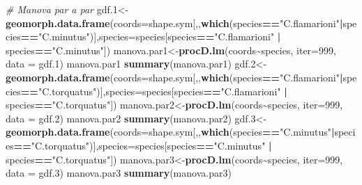 \documentclass[
]{book}
\newenvironment{Shaded}{\begin{snugshade}}{\end{snugshade}}
\newcommand{\AttributeTok}[1]{\textcolor[rgb]{0.13,0.29,0.53}{#1}}
\newcommand{\CommentTok}[1]{\textcolor[rgb]{0.56,0.35,0.01}{\textit{#1}}}
\newcommand{\DecValTok}[1]{\textcolor[rgb]{0.00,0.00,0.81}{#1}}
\newcommand{\FloatTok}[1]{\textcolor[rgb]{0.00,0.00,0.81}{#1}}
\newcommand{\FunctionTok}[1]{\textcolor[rgb]{0.13,0.29,0.53}{\textbf{#1}}}
\newcommand{\NormalTok}[1]{#1}
\newcommand{\OtherTok}[1]{\textcolor[rgb]{0.56,0.35,0.01}{#1}}
\newcommand{\SpecialCharTok}[1]{\textcolor[rgb]{0.81,0.36,0.00}{\textbf{#1}}}
\newcommand{\StringTok}[1]{\textcolor[rgb]{0.31,0.60,0.02}{#1}}
\begin{document}
\begin{Shaded}
\begin{Highlighting}[]
\CommentTok{\# Manova par a par}
\NormalTok{gdf}\FloatTok{.1}\OtherTok{\textless{}{-}} \FunctionTok{geomorph.data.frame}\NormalTok{(}\AttributeTok{coords=}\NormalTok{shape.sym[,,}\FunctionTok{which}\NormalTok{(species}\SpecialCharTok{==}\StringTok{"C.flamarioni"}\SpecialCharTok{|}\NormalTok{species}\SpecialCharTok{==}\StringTok{"C.minutus"}\NormalTok{)],}\AttributeTok{species=}\NormalTok{species[species}\SpecialCharTok{==}\StringTok{"C.flamarioni"} \SpecialCharTok{|}\NormalTok{ species}\SpecialCharTok{==}\StringTok{"C.minutus"}\NormalTok{])}
\NormalTok{manova.par1}\OtherTok{\textless{}{-}}\FunctionTok{procD.lm}\NormalTok{(coords}\SpecialCharTok{\textasciitilde{}}\NormalTok{species, }\AttributeTok{iter=}\DecValTok{999}\NormalTok{, }\AttributeTok{data =}\NormalTok{ gdf}\FloatTok{.1}\NormalTok{)}
\NormalTok{manova.par1}
\FunctionTok{summary}\NormalTok{(manova.par1)}
\NormalTok{gdf}\FloatTok{.2}\OtherTok{\textless{}{-}}
  \FunctionTok{geomorph.data.frame}\NormalTok{(}\AttributeTok{coords=}\NormalTok{shape.sym[,,}\FunctionTok{which}\NormalTok{(species}\SpecialCharTok{==}\StringTok{"C.flamarioni"}\SpecialCharTok{|}\NormalTok{species}\SpecialCharTok{==}\StringTok{"C.torquatus"}\NormalTok{)],}\AttributeTok{species=}\NormalTok{species[species}\SpecialCharTok{==}\StringTok{"C.flamarioni"} \SpecialCharTok{|}\NormalTok{ species}\SpecialCharTok{==}\StringTok{"C.torquatus"}\NormalTok{])}
\NormalTok{manova.par2}\OtherTok{\textless{}{-}}\FunctionTok{procD.lm}\NormalTok{(coords}\SpecialCharTok{\textasciitilde{}}\NormalTok{species, }\AttributeTok{iter=}\DecValTok{999}\NormalTok{, }\AttributeTok{data =}\NormalTok{ gdf}\FloatTok{.2}\NormalTok{)}
\NormalTok{manova.par2}
\FunctionTok{summary}\NormalTok{(manova.par2)}
\NormalTok{gdf}\FloatTok{.3}\OtherTok{\textless{}{-}}
  \FunctionTok{geomorph.data.frame}\NormalTok{(}\AttributeTok{coords=}\NormalTok{shape.sym[,,}\FunctionTok{which}\NormalTok{(species}\SpecialCharTok{==}\StringTok{"C.minutus"}\SpecialCharTok{|}\NormalTok{species}\SpecialCharTok{==}\StringTok{"C.torquatus"}\NormalTok{)],}\AttributeTok{species=}\NormalTok{species[species}\SpecialCharTok{==}\StringTok{"C.minutus"} \SpecialCharTok{|}\NormalTok{ species}\SpecialCharTok{==}\StringTok{"C.torquatus"}\NormalTok{])}
\NormalTok{manova.par3}\OtherTok{\textless{}{-}}\FunctionTok{procD.lm}\NormalTok{(coords}\SpecialCharTok{\textasciitilde{}}\NormalTok{species, }\AttributeTok{iter=}\DecValTok{999}\NormalTok{, }\AttributeTok{data =}\NormalTok{ gdf}\FloatTok{.3}\NormalTok{)}
\NormalTok{manova.par3}
\FunctionTok{summary}\NormalTok{(manova.par3)}
\end{Highlighting}
\end{Shaded}
\end{document}
